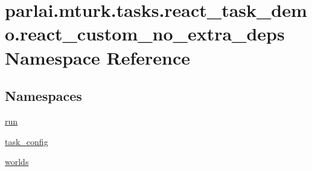 \hypertarget{namespaceparlai_1_1mturk_1_1tasks_1_1react__task__demo_1_1react__custom__no__extra__deps}{}\section{parlai.\+mturk.\+tasks.\+react\+\_\+task\+\_\+demo.\+react\+\_\+custom\+\_\+no\+\_\+extra\+\_\+deps Namespace Reference}
\label{namespaceparlai_1_1mturk_1_1tasks_1_1react__task__demo_1_1react__custom__no__extra__deps}
\subsection*{Namespaces}
\begin{DoxyCompactItemize}
\item 
 \hyperlink{namespaceparlai_1_1mturk_1_1tasks_1_1react__task__demo_1_1react__custom__no__extra__deps_1_1run}{run}
\item 
 \hyperlink{namespaceparlai_1_1mturk_1_1tasks_1_1react__task__demo_1_1react__custom__no__extra__deps_1_1task__config}{task\+\_\+config}
\item 
 \hyperlink{namespaceparlai_1_1mturk_1_1tasks_1_1react__task__demo_1_1react__custom__no__extra__deps_1_1worlds}{worlds}
\end{DoxyCompactItemize}
